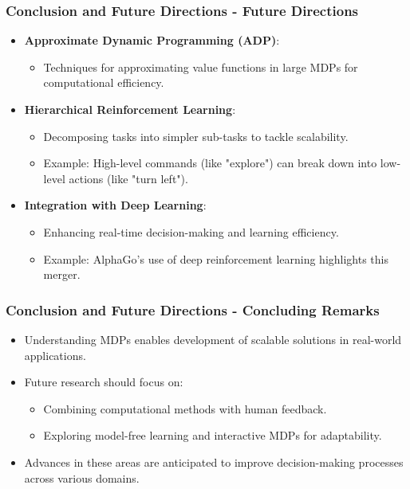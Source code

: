 \documentclass[aspectratio=169]{beamer}
\begin{document}
\begin{frame}[fragile]
    \frametitle{Conclusion and Future Directions - Future Directions}
    \begin{itemize}
        \item \textbf{Approximate Dynamic Programming (ADP)}:
        \begin{itemize}
            \item Techniques for approximating value functions in large MDPs for computational efficiency.
        \end{itemize}

        \item \textbf{Hierarchical Reinforcement Learning}:
        \begin{itemize}
            \item Decomposing tasks into simpler sub-tasks to tackle scalability.
            \item Example: High-level commands (like "explore") can break down into low-level actions (like "turn left").
        \end{itemize}

        \item \textbf{Integration with Deep Learning}:
        \begin{itemize}
            \item Enhancing real-time decision-making and learning efficiency.
            \item Example: AlphaGo's use of deep reinforcement learning highlights this merger.
        \end{itemize}
    \end{itemize}
\end{frame}

\begin{frame}[fragile]
    \frametitle{Conclusion and Future Directions - Concluding Remarks}
    \begin{itemize}
        \item Understanding MDPs enables development of scalable solutions in real-world applications.
        \item Future research should focus on:
        \begin{itemize}
            \item Combining computational methods with human feedback.
            \item Exploring model-free learning and interactive MDPs for adaptability.
        \end{itemize}
        \item Advances in these areas are anticipated to improve decision-making processes across various domains.
    \end{itemize}
\end{frame}
\end{document}
